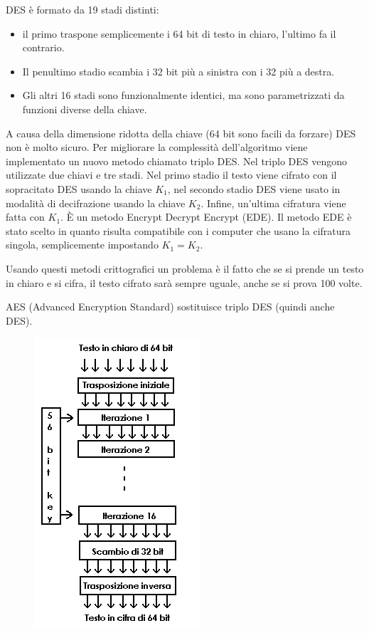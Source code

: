DES è formato da 19 stadi distinti:
\begin{itemize}
\item	il primo traspone semplicemente i 64 bit di testo in chiaro, l’ultimo fa il contrario.
\item	Il penultimo stadio scambia i 32 bit più a sinistra con i 32 più a destra.
\item	Gli altri 16 stadi sono funzionalmente identici, ma sono parametrizzati da funzioni diverse della chiave.
\end{itemize}
A causa della dimensione ridotta della chiave (64 bit sono facili da forzare) DES non è molto sicuro.
Per migliorare la complessità dell’algoritmo viene implementato un nuovo metodo chiamato triplo DES. Nel triplo DES vengono utilizzate due chiavi e tre stadi. Nel primo stadio il testo viene cifrato con il sopracitato DES usando la chiave $K_1$, nel secondo stadio DES viene usato in modalità di decifrazione usando la chiave $K_2$. Infine, un’ultima cifratura viene fatta con $K_1$. È un metodo Encrypt Decrypt Encrypt (EDE). Il metodo EDE è stato scelto in quanto risulta compatibile con i computer che usano la cifratura singola, semplicemente impostando $K_1=K_2$.

Usando questi metodi crittografici un problema è il fatto che se si prende un testo in chiaro e si cifra, il testo cifrato sarà sempre uguale, anche se si prova 100 volte. 

AES (Advanced Encryption Standard) sostituisce triplo DES (quindi anche DES).

\begin{figure}[H]
\centering
\includegraphics[scale=0.8]{res/img/53_DES.png}
\end{figure}

